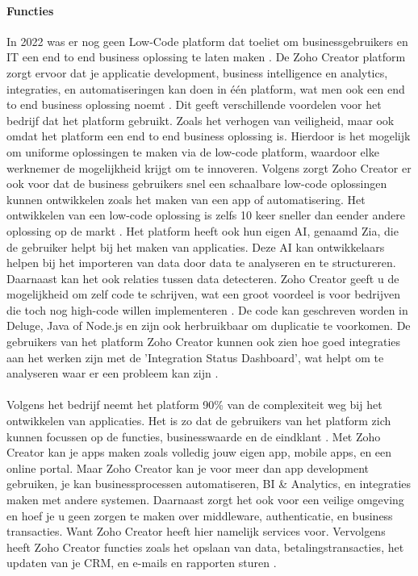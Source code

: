 \paragraph{Functies}
In 2022 was er nog geen Low-Code platform dat toeliet om businessgebruikers en IT een end to end business oplossing te laten maken \autocite{Computer2022}.
De Zoho Creator platform zorgt ervoor dat je applicatie development, business intelligence en analytics, integraties, en automatiseringen kan doen in één platform, wat men ook een end to end business oplossing noemt \autocite{Computer2022}.
Dit geeft verschillende voordelen voor het bedrijf dat het platform gebruikt. Zoals het verhogen van veiligheid, maar ook omdat het platform een end to end business oplossing is. Hierdoor is het mogelijk om uniforme oplossingen te maken via de low-code platform,
waardoor elke werknemer de mogelijkheid krijgt om te innoveren. Volgens \textcite{Computer2022} zorgt Zoho Creator er ook voor dat de business gebruikers snel een schaalbare low-code oplossingen kunnen ontwikkelen zoals het maken van een app of automatisering.
Het ontwikkelen van een low-code oplossing is zelfs 10 keer sneller dan eender andere oplossing op de markt \autocite{Computer2022}. Het platform heeft ook hun eigen AI, genaamd Zia, die de gebruiker helpt bij het maken van applicaties. Deze AI
kan ontwikkelaars helpen bij het importeren van data door data te analyseren en te structureren. Daarnaast kan het ook relaties tussen data detecteren. 
Zoho Creator geeft u de mogelijkheid om zelf code te schrijven, wat een groot voordeel is voor bedrijven die toch nog high-code willen implementeren \autocite{Computer2022}. 
De code kan geschreven worden in Deluge, Java of Node.js en zijn ook herbruikbaar om duplicatie te voorkomen.
De gebruikers van het platform Zoho Creator kunnen ook zien hoe goed integraties aan het werken zijn met de 'Integration Status Dashboard', wat helpt om te analyseren waar er een probleem kan zijn \autocite{Computer2022}.
\\ %
\\
Volgens het bedrijf \textcite{ZohoCorporation2024b} neemt het platform 90\% van de complexiteit weg bij het ontwikkelen van applicaties. Het is zo dat de gebruikers van het platform
zich kunnen focussen op de functies, businesswaarde en de eindklant \autocite{ZohoCorporation2024b}.  Met Zoho Creator kan je apps maken zoals volledig jouw eigen app, mobile apps, en een online portal.
Maar Zoho Creator kan je voor meer dan app development gebruiken, je kan businessprocessen automatiseren, BI \& Analytics, en integraties maken met andere systemen. Daarnaast zorgt het ook voor een veilige omgeving en hoef je u geen zorgen 
te maken over middleware, authenticatie, en business transacties. Want Zoho Creator heeft hier namelijk services voor. Vervolgens heeft Zoho Creator functies zoals het opslaan van data,
betalingstransacties, het updaten van je CRM, en e-mails en rapporten sturen \autocite{ZohoCorporation2024b}.

